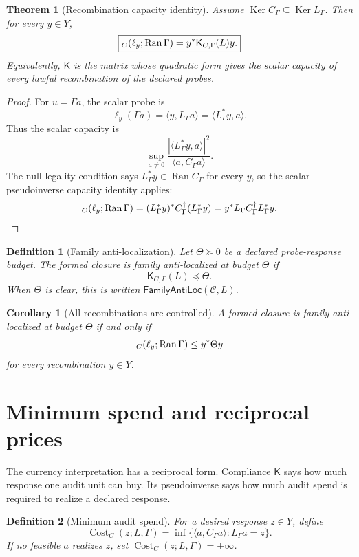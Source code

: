 \documentclass[11pt]{article}
\newtheorem{theorem}{Theorem}
\newtheorem{definition}{Definition}
\newtheorem{corollary}{Corollary}
\newcommand{\Ran}{\operatorname{Ran}}
\newcommand{\Ker}{\operatorname{Ker}}
\let\Cap\relax
\newcommand{\Cap}{\operatorname{Cap}}
\newcommand{\Cost}{\operatorname{Cost}}
\begin{document}
\begin{theorem}[Recombination capacity identity]
Assume $\Ker C_\Gamma\subseteq\Ker L_\Gamma$.  Then for every $y\in Y$,
\[
        \boxed{
        \Cap_C(\ell_y;\Ran\Gamma)=y^*\mathsf K_{C,\Gamma}(L)y.
        }
\]
Equivalently, $\mathsf K$ is the matrix whose quadratic form gives the scalar capacity of every lawful recombination of the declared probes.
\end{theorem}

\begin{proof}
For $u=\Gamma a$, the scalar probe is
\[
        \ell_y(\Gamma a)=\langle y,L_\Gamma a\rangle=\langle L_\Gamma^*y,a\rangle.
\]
Thus the scalar capacity is
\[
        \sup_{a\ne0}\frac{|\langle L_\Gamma^*y,a\rangle|^2}{\langle a,C_\Gamma a\rangle}.
\]
The null legality condition says $L_\Gamma^*y\in \Ran C_\Gamma$ for every $y$, so the scalar pseudoinverse capacity identity applies:
\[
        \Cap_C(\ell_y;\Ran\Gamma)
        =(L_\Gamma^*y)^*C_\Gamma^\dagger(L_\Gamma^*y)
        =y^*L_\Gamma C_\Gamma^\dagger L_\Gamma^*y.
\]
\end{proof}

\begin{definition}[Family anti-localization]
Let $\Theta\succeq0$ be a declared probe-response budget.  The formed closure is \emph{family anti-localized at budget $\Theta$} if
\[
        \boxed{\mathsf K_{C,\Gamma}(L)\preceq \Theta.}
\]
When $\Theta$ is clear, this is written $\mathsf{FamilyAntiLoc}(\mathcal C,L)$.
\end{definition}

\begin{corollary}[All recombinations are controlled]
A formed closure is family anti-localized at budget $\Theta$ if and only if
\[
        \Cap_C(\ell_y;\Ran\Gamma)\le y^*\Theta y
\]
for every recombination $y\in Y$.
\end{corollary}

\section{Minimum spend and reciprocal prices}
The currency interpretation has a reciprocal form.  Compliance $\mathsf K$ says how much response one audit unit can buy.  Its pseudoinverse says how much audit spend is required to realize a declared response.

\begin{definition}[Minimum audit spend]
For a desired response $z\in Y$, define
\[
        \Cost_C(z;L,\Gamma)
        =\inf\{\langle a,C_\Gamma a\rangle:
                L_\Gamma a=z\}.
\]
If no feasible $a$ realizes $z$, set $\Cost_C(z;L,\Gamma)=+\infty$.
\end{definition}
\end{document}
